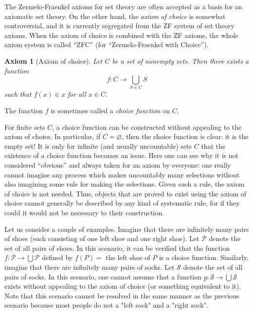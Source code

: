 \documentclass[12pt]{article}
\begin{document}
\newtheorem*{axiom*}{Axiom}

The Zermelo-Fraenkel axioms for set theory are often accepted as a basis for an axiomatic set theory. 
On the other hand, the \emph{axiom of choice} is somewhat controversial, and it is currently segregated from the ZF system of set theory axioms.  When the axiom of choice is combined with the ZF axioms, the whole axiom system is
called ``ZFC'' (for ``Zermelo-Fraenkel with Choice'').

\begin{axiom*}[Axiom of choice]
Let $C$ be a set of nonempty sets. Then there exists a function
\[
f\colon C\to \bigcup_{S\in C} S
\]
such that $f(x) \in x$ for all $x \in C$.
\end{axiom*}
The function $f$ is sometimes called a \emph{choice function} on $C$.

For finite sets $C$, a choice function can be constructed without appealing to the axiom of choice.  In particular, if $C=\varnothing$, then the choice function is clear: it is the empty set!  It is only for infinite (and usually uncountable) sets $C$ that the existence of a choice function becomes an issue. Here one can see why it is not considered ``obvious'' and always taken for an axiom by everyone:
one really cannot imagine any process which makes uncountably many selections without also imagining some rule for making the selections. Given such a rule, the axiom of choice is not needed.  Thus, objects that are proved to exist using the axiom of choice cannot generally be described by any kind of systematic rule, for if they could it would not be necessary to their construction.

Let us consider a couple of examples.  Imagine that there are infinitely many pairs of shoes (each consisting of one left shoe and one right shoe).  Let $\mathcal{P}$ denote the set of all pairs of shoes.  In this scenario, it can be verified that the function $\displaystyle f \colon \mathcal{P} \to \bigcup \mathcal{P}$ defined by $f(P)=\text{ the left shoe of }P$ is a choice function.  Similarly, imagine that there are infinitely many pairs of socks.  Let $\mathcal{S}$ denote the set of all pairs of socks.  In this scenario, one cannot assume that a function $\displaystyle g \colon \mathcal{S} \to \bigcup \mathcal{S}$ exists without appealing to the axiom of choice (or something equivalent to it).  Note that this scenario cannot be resolved in the same manner as the previous scenario because most people do not  a "left sock" and a "right sock".
\end{document}
